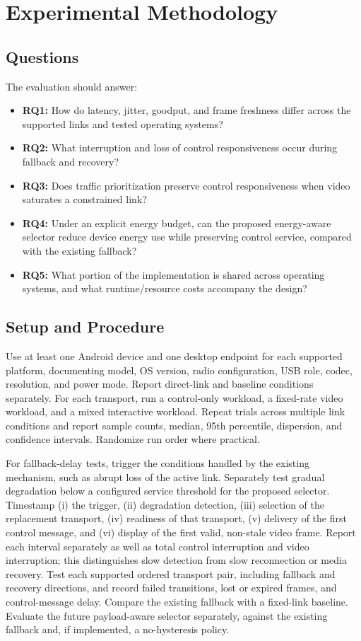 \documentclass[conference]{IEEEtran}
\begin{document}
\section{Experimental Methodology}
\subsection{Questions}
The evaluation should answer:
\begin{itemize}
  \item \textbf{RQ1:} How do latency, jitter, goodput, and frame freshness
  differ across the supported links and tested operating systems?
  \item \textbf{RQ2:} What interruption and loss of control responsiveness
  occur during fallback and recovery?
  \item \textbf{RQ3:} Does traffic prioritization preserve control
  responsiveness when video saturates a constrained link?
  \item \textbf{RQ4:} Under an explicit energy budget, can the proposed
  energy-aware selector reduce device energy use while preserving control
  service, compared with the existing fallback?
  \item \textbf{RQ5:} What portion of the implementation is shared across
  operating systems, and what runtime/resource costs accompany the design?
\end{itemize}

\subsection{Setup and Procedure}
Use at least one Android device and one desktop endpoint for each supported
platform, documenting model, OS version, radio configuration, USB role,
codec, resolution, and power mode. Report direct-link and baseline conditions
separately. For each transport, run a control-only workload, a fixed-rate
video workload, and a mixed interactive workload. Repeat trials across
multiple link conditions and report sample counts, median, 95th percentile,
dispersion, and confidence intervals. Randomize run order where practical.

For fallback-delay tests, trigger the conditions handled by the existing
mechanism, such as abrupt loss of the active link. Separately test gradual
degradation below a configured service threshold for the proposed selector.
Timestamp (i) the trigger, (ii) degradation detection, (iii) selection of the replacement
transport, (iv) readiness of that transport, (v) delivery of the first
control message, and (vi) display of the first valid, non-stale video frame.
Report each interval separately as well as total control interruption and
video interruption; this distinguishes slow detection from slow reconnection
or media recovery. Test each supported ordered transport pair, including
fallback and recovery directions, and record failed transitions, lost or
expired frames, and control-message delay. Compare the existing fallback with a fixed-link baseline. Evaluate the
future payload-aware selector separately, against the existing fallback and,
if implemented, a no-hysteresis policy.
\end{document}

